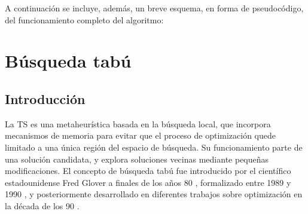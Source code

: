 A continuación se incluye, además, un breve esquema, en forma de pseudocódigo, del funcionamiento completo del algoritmo:

\vspace{1.5em}

\begin{algorithm}[H]
\caption{Pseudocódigo del algoritmo de recocido simulado propuesto para el TSP}
\label{alg:sa}
\DontPrintSemicolon


\end{algorithm}

\newpage

\section{Búsqueda tabú}
\label{sec:ts}

\subsection{Introducción}
\label{subsec:ts_intro}

La \ac{TS} es una metaheurística basada en la búsqueda local, que incorpora mecanismos de memoria para evitar que el 
proceso de optimización quede limitado a una única región del espacio de búsqueda. Su funcionamiento parte de una 
solución candidata, y explora soluciones vecinas mediante pequeñas modificaciones. El concepto de búsqueda tabú fue
introducido por el científico estadounidense Fred Glover a finales de los años 80 \cite{glover1986}, formalizado entre
1989 y 1990 \cite{glover1989} \cite{glover1990}, y posteriormente desarrollado en diferentes trabajos sobre optimización
en la década de los 90 \cite{cvijovic1995} \cite{glover1997}.

